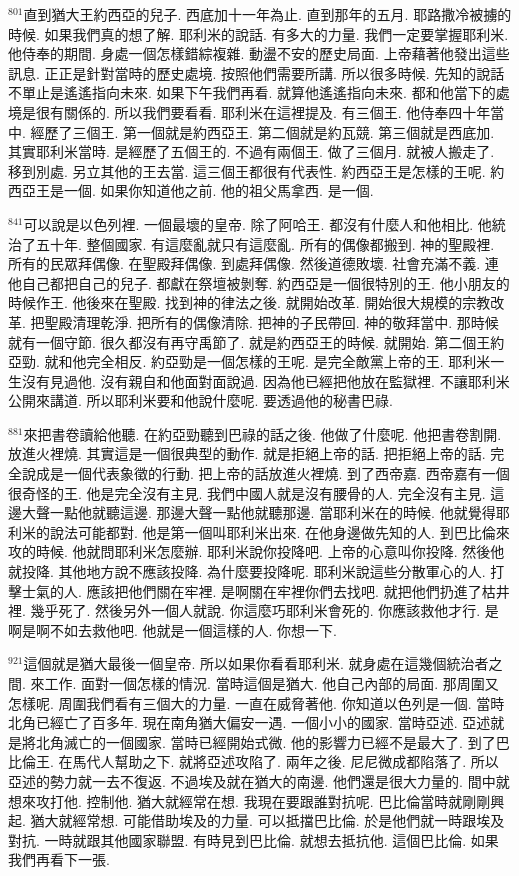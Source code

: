 \documentclass{book}
\begin{document}
$^{801}$直到猶大王約西亞的兒子.
西底加十一年為止.
直到那年的五月.
耶路撒冷被擄的時候.
如果我們真的想了解.
耶利米的說話.
有多大的力量.
我們一定要掌握耶利米.
他侍奉的期間.
身處一個怎樣錯綜複雜.
動盪不安的歷史局面.
上帝藉著他發出這些訊息.
正正是針對當時的歷史處境.
按照他們需要所講.
所以很多時候.
先知的說話不單止是遙遙指向未來.
如果下午我們再看.
就算他遙遙指向未來.
都和他當下的處境是很有關係的.
所以我們要看看.
耶利米在這裡提及.
有三個王.
他侍奉四十年當中.
經歷了三個王.
第一個就是約西亞王.
第二個就是約瓦競.
第三個就是西底加.
其實耶利米當時.
是經歷了五個王的.
不過有兩個王.
做了三個月.
就被人搬走了.
移到別處.
另立其他的王去當.
這三個王都很有代表性.
約西亞王是怎樣的王呢.
約西亞王是一個.
如果你知道他之前.
他的祖父馬拿西.
是一個.

$^{841}$可以說是以色列裡.
一個最壞的皇帝.
除了阿哈王.
都沒有什麼人和他相比.
他統治了五十年.
整個國家.
有這麼亂就只有這麼亂.
所有的偶像都搬到.
神的聖殿裡.
所有的民眾拜偶像.
在聖殿拜偶像.
到處拜偶像.
然後道德敗壞.
社會充滿不義.
連他自己都把自己的兒子.
都獻在祭壇被剝奪.
約西亞是一個很特別的王.
他小朋友的時候作王.
他後來在聖殿.
找到神的律法之後.
就開始改革.
開始很大規模的宗教改革.
把聖殿清理乾淨.
把所有的偶像清除.
把神的子民帶回.
神的敬拜當中.
那時候就有一個守節.
很久都沒有再守禹節了.
就是約西亞王的時候.
就開始.
第二個王約亞勁.
就和他完全相反.
約亞勁是一個怎樣的王呢.
是完全敵黨上帝的王.
耶利米一生沒有見過他.
沒有親自和他面對面說過.
因為他已經把他放在監獄裡.
不讓耶利米公開來講道.
所以耶利米要和他說什麼呢.
要透過他的秘書巴祿.

$^{881}$來把書卷讀給他聽.
在約亞勁聽到巴祿的話之後.
他做了什麼呢.
他把書卷割開.
放進火裡燒.
其實這是一個很典型的動作.
就是拒絕上帝的話.
把拒絕上帝的話.
完全說成是一個代表象徵的行動.
把上帝的話放進火裡燒.
到了西帝嘉.
西帝嘉有一個很奇怪的王.
他是完全沒有主見.
我們中國人就是沒有腰骨的人.
完全沒有主見.
這邊大聲一點他就聽這邊.
那邊大聲一點他就聽那邊.
當耶利米在的時候.
他就覺得耶利米的說法可能都對.
他是第一個叫耶利米出來.
在他身邊做先知的人.
到巴比倫來攻的時候.
他就問耶利米怎麼辦.
耶利米說你投降吧.
上帝的心意叫你投降.
然後他就投降.
其他地方說不應該投降.
為什麼要投降呢.
耶利米說這些分散軍心的人.
打擊士氣的人.
應該把他們關在牢裡.
是啊關在牢裡你們去找吧.
就把他們扔進了枯井裡.
幾乎死了.
然後另外一個人就說.
你這麼巧耶利米會死的.
你應該救他才行.
是啊是啊不如去救他吧.
他就是一個這樣的人.
你想一下.

$^{921}$這個就是猶大最後一個皇帝.
所以如果你看看耶利米.
就身處在這幾個統治者之間.
來工作.
面對一個怎樣的情況.
當時這個是猶大.
他自己內部的局面.
那周圍又怎樣呢.
周圍我們看有三個大的力量.
一直在威脅著他.
你知道以色列是一個.
當時北角已經亡了百多年.
現在南角猶大偏安一遇.
一個小小的國家.
當時亞述.
亞述就是將北角滅亡的一個國家.
當時已經開始式微.
他的影響力已經不是最大了.
到了巴比倫王.
在馬代人幫助之下.
就將亞述攻陷了.
兩年之後.
尼尼微成都陷落了.
所以亞述的勢力就一去不復返.
不過埃及就在猶大的南邊.
他們還是很大力量的.
間中就想來攻打他.
控制他.
猶大就經常在想.
我現在要跟誰對抗呢.
巴比倫當時就剛剛興起.
猶大就經常想.
可能借助埃及的力量.
可以抵擋巴比倫.
於是他們就一時跟埃及對抗.
一時就跟其他國家聯盟.
有時見到巴比倫.
就想去抵抗他.
這個巴比倫.
如果我們再看下一張.
\end{document}
